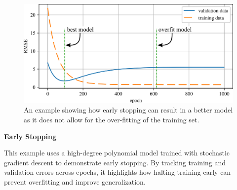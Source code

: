 \documentclass[12pt,letter]{article}
\begin{document}


		\begin{figure}[H]
			\centering
			\includegraphics[width=6in]{../figures/early_stopping.png}
			\caption{An example showing how early stopping can result in a better model as it does not allow for the over-fitting of the training set.}
			\label{fig:early_stopping}
		\end{figure}


\begin{example}
\textbf{Early Stopping}

\noindent This example uses a high-degree polynomial model trained with stochastic gradient descent to demonstrate early stopping. By tracking training and validation errors across epochs, it highlights how halting training early can prevent overfitting and improve generalization.
\end{example}


\pagebreak



\end{document}
